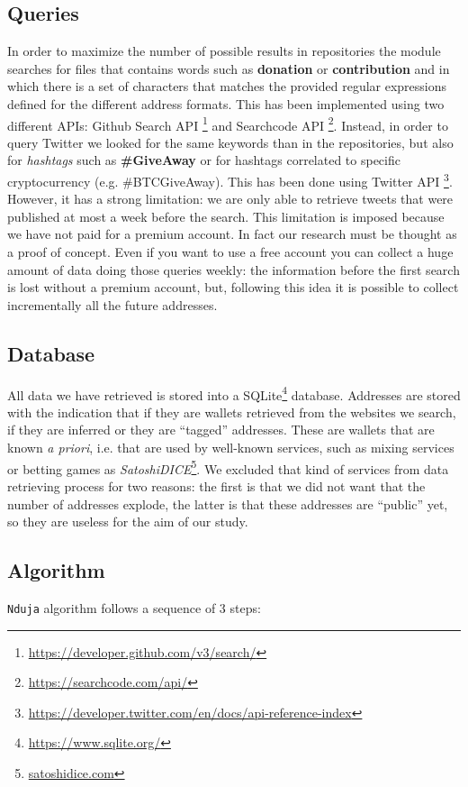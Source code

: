 \subsection{Queries} 
\label{sec:queries}
In order to maximize the number of possible results in repositories the module
\walletcollector{} searches for files that contains words such as
\textbf{donation} or \textbf{contribution} and in which there is a set of
characters that matches the provided regular expressions defined for the 
different address formats. This has been implemented using two different APIs: Github Search API \footnote{\url{https://developer.github.com/v3/search/}} and
Searchcode API \footnote{\url{https://searchcode.com/api/}}.
Instead, in order to query Twitter we looked for the same keywords than in the
repositories, but also for \textit{hashtags} such as \textbf{\#GiveAway} or for
hashtags correlated to specific cryptocurrency (e.g. \#BTCGiveAway). This has
been done using Twitter API
\footnote{\url{https://developer.twitter.com/en/docs/api-reference-index}}.
However, it has a strong limitation: we are only able to retrieve tweets that
were published at most a week before the search. This limitation is imposed
because we have not paid for a premium account. In fact our research must be
thought as a proof of concept. Even if you want to use a free account you can
collect a huge amount of data doing those queries weekly: the information before the first search is lost without a premium account, but, following this idea it is possible to collect incrementally all the future addresses.

\subsection{Database}
All data we have retrieved is stored into a
SQLite\footnote{\url{https://www.sqlite.org/}} database. Addresses are stored
with the indication that if they are wallets retrieved from the websites we search,
if they are inferred or they are ``tagged'' addresses. These are wallets that
are known \emph{a priori}, i.e. that are used by well-known services, such as mixing services or betting games as
\textit{SatoshiDICE}\footnote{\url{satoshidice.com}}. 
We excluded that kind of
services from data retrieving process for two reasons: the first is that we did
not want that the number of addresses explode, the latter is that these
addresses are ``public'' yet, so they are useless for the aim of our study.

\subsection{Algorithm}
\texttt{Nduja} algorithm follows a sequence of 3 steps:
